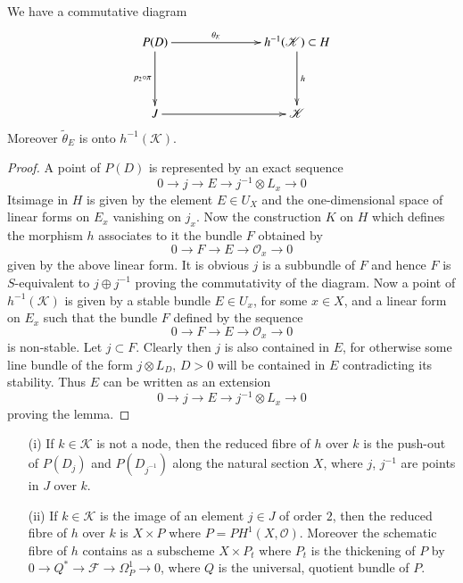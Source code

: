 \begin{lemma}\label{art05-lem7.3}
We have a commutative diagram
\[
\xymatrix@C=2.5cm@R=1.5cm{
P(D)\ar[d]_-{p_{2}\circ \pi}\ar[r]^-{\theta_{E}} &
h^{-1}(\mathscr{K})\subset H\ar[d]^-{h}\\
J\ar[r] & \mathscr{K}
}
\]
Moreover $\widetilde{\theta}_{E}$ is onto $h^{-1}(\mathscr{K})$.
\end{lemma}

\begin{proof}
A point of $P(D)$ is represented by an exact sequence
$$
0\to j\to E\to j^{-1}\otimes L_{x}\to 0
$$
Its\pageoriginale image in $H$ is given by the element $E\in U_{X}$
and the one-dimensional space of linear forms on $E_{x}$ vanishing on
$j_{x}$. Now the construction $K$ on $H$ which defines the morphism
$h$ associates to it the bundle $F$ obtained by
$$
0\to F\to E\to \mathscr{O}_{x}\to 0
$$
given by the above linear form. It is obvious $j$ is a subbundle of
$F$ and hence $F$ is $S$-equivalent to $j\oplus j^{-1}$ proving the
commutativity of the diagram. Now a point of $h^{-1}(\mathscr{K})$ is
given by a stable bundle $E\in U_{x}$, for some $x\in X$, and a linear
form on $E_{x}$ such that the bundle $F$ defined by the sequence
$$
0\to F\to E\to \mathscr{O}_{x}\to 0
$$
is non-stable. Let $j\subset F$. Clearly then $j$ is also contained in
$E$, for otherwise some line bundle of the form $j\otimes L_{D}$,
$D>0$ will be contained in $E$ contradicting its stability. Thus $E$
can be written as an extension
$$
0\to j\to E\to j^{-1}\otimes L_{x}\to 0
$$
proving the lemma.
\end{proof}

\begin{lemma}\label{art05-lem7.4}
\begin{itemize}
\item[\rm(i)] If $k\in \mathscr{K}$ is not a node, then the reduced
fibre of $h$ over $k$ is the push-out of $P(D_{j})$ and $P(D_{j^{-1}})$
along the natural section $X$, where $j$, $j^{-1}$ are points in $J$
over $k$.

\item[\rm(ii)] If $k\in \mathscr{K}$ is the image of an element $j\in
J$ of order $2$, then the reduced fibre of $h$ over $k$ is $X\times P$
where $P=PH^{1}(X,\mathscr{O})$. Moreover the schematic fibre of $h$
contains as a subscheme $X\times P_{t}$ where $P_{t}$ is the
thickening of $P$ by $0\to Q^{*}\to \mathscr{F}\to \Omega^{1}_{P}\to
0$, where $Q$ is the universal, quotient bundle of $P$.
\end{itemize}
\end{lemma}

